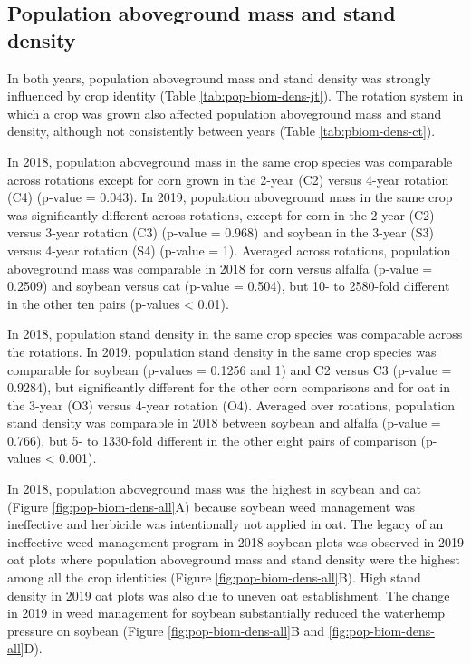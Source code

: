 \documentclass[
]{article}
\begin{document}
\hypertarget{population-aboveground-mass-and-stand-density}{%
\subsection*{Population aboveground mass and stand density}\label{population-aboveground-mass-and-stand-density}}

In both years, population aboveground mass and stand density was strongly influenced by crop identity (Table \ref{tab:pop-biom-dens-jt}). The rotation system in which a crop was grown also affected population aboveground mass and stand density, although not consistently between years (Table \ref{tab:pbiom-dens-ct}).

In 2018, population aboveground mass in the same crop species was comparable across rotations except for corn grown in the 2-year (C2) versus 4-year rotation (C4) (p-value = 0.043). In 2019, population aboveground mass in the same crop was significantly different across rotations, except for corn in the 2-year (C2) versus 3-year rotation (C3) (p-value = 0.968) and soybean in the 3-year (S3) versus 4-year rotation (S4) (p-value = 1). Averaged across rotations, population aboveground mass was comparable in 2018 for corn versus alfalfa (p-value = 0.2509) and soybean versus oat (p-value = 0.504), but 10- to 2580-fold different in the other ten pairs (p-values \textless{} 0.01).

In 2018, population stand density in the same crop species was comparable across the rotations. In 2019, population stand density in the same crop species was comparable for soybean (p-values = 0.1256 and 1) and C2 versus C3 (p-value = 0.9284), but significantly different for the other corn comparisons and for oat in the 3-year (O3) versus 4-year rotation (O4). Averaged over rotations, population stand density was comparable in 2018 between soybean and alfalfa (p-value = 0.766), but 5- to 1330-fold different in the other eight pairs of comparison (p-values \textless{} 0.001).

In 2018, population aboveground mass was the highest in soybean and oat (Figure \ref{fig:pop-biom-dens-all}A) because soybean weed management was ineffective and herbicide was intentionally not applied in oat. The legacy of an ineffective weed management program in 2018 soybean plots was observed in 2019 oat plots where population aboveground mass and stand density were the highest among all the crop identities (Figure \ref{fig:pop-biom-dens-all}B). High stand density in 2019 oat plots was also due to uneven oat establishment. The change in 2019 in weed management for soybean substantially reduced the waterhemp pressure on soybean (Figure \ref{fig:pop-biom-dens-all}B and \ref{fig:pop-biom-dens-all}D).
\end{document}
